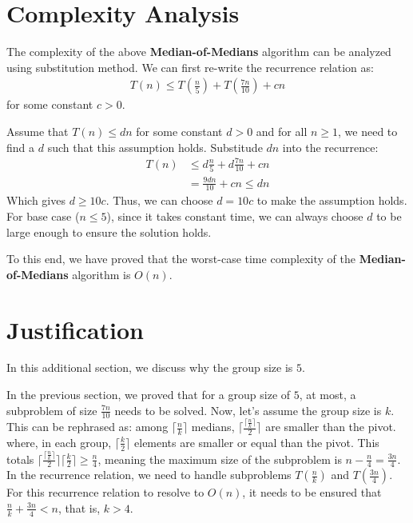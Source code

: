 \documentclass[11pt, a4paper, oneside]{memoir}
\begin{document}
\section{Complexity Analysis}
The complexity of the above \textbf{Median-of-Medians} algorithm can be analyzed using substitution method.
We can first re-write the recurrence relation as:
\begin{align*}
    T(n) \leq T(\frac{n}{5}) + T(\frac{7n}{10}) + cn
\end{align*}
for some constant $c > 0$.

Assume that $T(n) \leq dn$ for some constant $d > 0$ and for all $n \geq 1$, we need to find a $d$ such that this assumption holds.
Substitude $dn$ into the recurrence:
\begin{align*}
    T(n) & \leq d\frac{n}{5} + d\frac{7n}{10} + cn \\
         & = \frac{9dn}{10} + cn \leq dn
\end{align*}
Which gives $d \geq 10c$. Thus, we can choose $d = 10c$ to make the assumption holds.
For base case ($n \leq 5$), since it takes constant time, we can always choose $d$ to be large enough to ensure the solution holds.

To this end, we have proved that the worst-case time complexity of the \textbf{Median-of-Medians} algorithm is $O(n)$.

\section*{Justification}
\label{just}
In this additional section, we discuss why the group size is $5$.

In the previous section, we proved that for a group size of $5$, at most, a subproblem of size $\frac{7n}{10}$ needs to be solved.
Now, let's assume the group size is $k$.
This can be rephrased as: among $\lceil \frac{n}{k} \rceil$ medians, $\lceil \frac{\lceil \frac{n}{k} \rceil}{2} \rceil$ are smaller than the pivot.
where, in each group, $\lceil \frac{k}{2} \rceil$ elements are smaller or equal than the pivot. This totals $\lceil \frac{\lceil \frac{n}{k} \rceil}{2} \rceil \lceil \frac{k}{2} \rceil \geq \frac{n}{4}$\footnotemark,
meaning the maximum size of the subproblem is $n-\frac{n}{4}=\frac{3n}{4}$.
In the recurrence relation, we need to handle subproblems $T(\frac{n}{k})$ and $T(\frac{3n}{4})$.
For this recurrence relation to resolve to $O(n)$, it needs to be ensured that $\frac{n}{k}+\frac{3n}{4} < n$, that is, $k > 4$.

\end{document}

